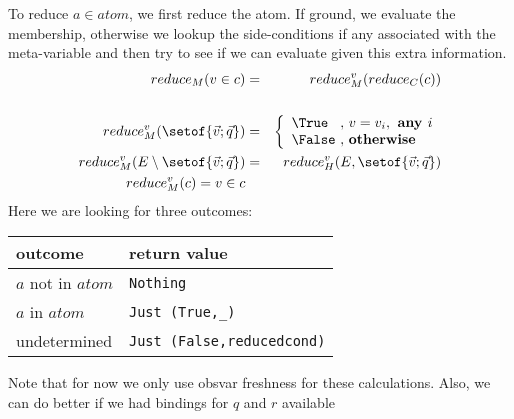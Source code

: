 To reduce $a \in atom$,
we first reduce the atom.
If ground, we evaluate the membership,
otherwise we lookup the side-conditions
if any associated with the meta-variable
and then try to see if we can evaluate
given this extra information.
\begin{eqnarray*}
   reduce_M(v \in c) &=& reduce^v_M(reduce_C(c))
\\
\\ reduce^v_M(\setof{\vec v;\vec q})
   &=&
   \left\{\begin{array}{l@{~,~}l}
     \True & v = v_i, \textbf{ any } i \\
     \False & \textbf{otherwise}
   \end{array}\right.
\\ reduce^v_M(E \setminus \setof{\vec v;\vec q})
   &=& reduce^v_H(E, \setof{\vec v;\vec q})
\\ reduce^v_M(c) = v \in c
\end{eqnarray*}
Here we are looking for three outcomes:

\begin{tabular}{|l|l|}
  \hline
  outcome & return value \\
  \hline
  $a$ not in $atom$ & \texttt{Nothing} \\
  \hline
  $a$ in $atom$ & \texttt{Just (True,\_)} \\
  \hline
  undetermined & \texttt{Just (False,reducedcond)} \\
  \hline
\end{tabular}

Note that for now we only use obsvar freshness
for these calculations. 
Also, we can do better if we had bindings for $q$ and $r$ available